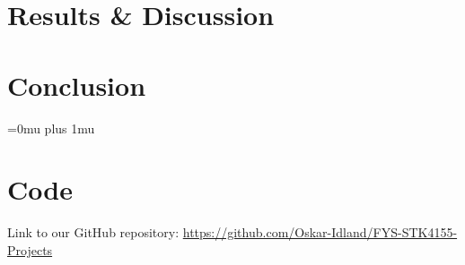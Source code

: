 \documentclass[aps,pra,english,notitlepage,reprint,nofootinbib]{revtex4-1}  %
\begin{document}






\section{Results \& Discussion}\label{sec:results discussion}


\section{Conclusion}\label{sec:conclusion}


\Urlmuskip=0mu plus 1mu\relax
\onecolumngrid


\newpage
\appendix
\section{Code}\label{appsec:code}
Link to our GitHub repository: \href{https://github.com/Oskar-Idland/FYS-STK4155-Projects}{https://github.com/Oskar-Idland/FYS-STK4155-Projects}
\end{document}
